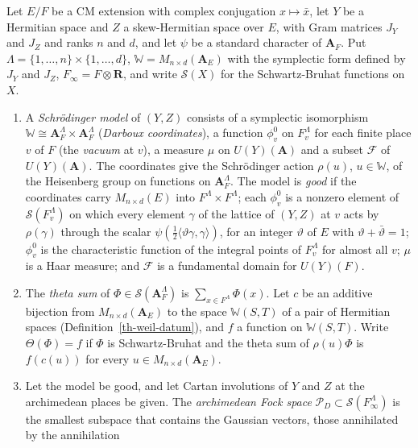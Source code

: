 \begin{definition}\label{th-darboux-model}
Let $E/F$ be a CM extension with complex conjugation $x\mapsto\bar x$, let
$Y$ be a Hermitian space and $Z$ a skew-Hermitian space over $E$, with Gram
matrices $J_Y$ and $J_Z$ and ranks $n$ and $d$, and let $\psi$ be a standard
character of $\mathbf A_F$. Put $\Lambda=\{1,\ldots,n\}\times\{1,\ldots,d\}$,
$\mathbb W=M_{n\times d}(\mathbf A_E)$ with the symplectic form defined by
$J_Y$ and $J_Z$, $F_\infty=F\otimes\mathbf R$, and write $\mathcal S(X)$ for
the Schwartz-Bruhat functions on $X$.
\begin{enumerate}
\item A \emph{Schrödinger model} of $(Y,Z)$ consists of a symplectic
  isomorphism $\mathbb W\cong\mathbf A_F^\Lambda\times\mathbf A_F^\Lambda$
  (\emph{Darboux coordinates}), a function $\phi^0_v$ on $F_v^\Lambda$ for each
  finite place $v$ of $F$ (the \emph{vacuum} at $v$), a measure $\mu$ on
  $U(Y)(\mathbf A)$ and a subset $\mathcal F$ of $U(Y)(\mathbf A)$. The
  coordinates give the Schrödinger action $\rho(u)$, $u\in\mathbb W$, of the
  Heisenberg group on functions on $\mathbf A_F^\Lambda$. The model is
  \emph{good} if the coordinates carry $M_{n\times d}(E)$ into
  $F^\Lambda\times F^\Lambda$; each $\phi^0_v$ is a nonzero element of
  $\mathcal S(F_v^\Lambda)$ on which every element $\gamma$ of the lattice of
  $(Y,Z)$ at $v$ acts by $\rho(\gamma)$ through the scalar
  $\psi(\tfrac12\langle\vartheta\gamma,\gamma\rangle)$, for an integer
  $\vartheta$ of $E$ with $\vartheta+\bar\vartheta=1$; $\phi^0_v$ is the
  characteristic function of the integral points of $F_v^\Lambda$ for almost
  all $v$; $\mu$ is a Haar measure; and $\mathcal F$ is a fundamental domain
  for $U(Y)(F)$.
\item The \emph{theta sum} of $\Phi\in\mathcal S(\mathbf A_F^\Lambda)$ is
  $\sum_{x\in F^\Lambda}\Phi(x)$. Let $c$ be an additive bijection from
  $M_{n\times d}(\mathbf A_E)$ to the space $\mathbb W(S,T)$ of a pair of
  Hermitian spaces (Definition~\ref{th-weil-datum}), and $f$ a function on
  $\mathbb W(S,T)$. Write $\Theta(\Phi)=f$ if $\Phi$ is Schwartz-Bruhat and
  the theta sum of $\rho(u)\Phi$ is $f(c(u))$ for every
  $u\in M_{n\times d}(\mathbf A_E)$.
\item Let the model be good, and let Cartan involutions of $Y$ and $Z$ at the
  archimedean places be given. The \emph{archimedean Fock space}
  $\mathcal P_D\subset\mathcal S(F_\infty^\Lambda)$ is the smallest subspace
  that contains the Gaussian vectors, those annihilated by the annihilation

\end{enumerate}
\end{definition}
